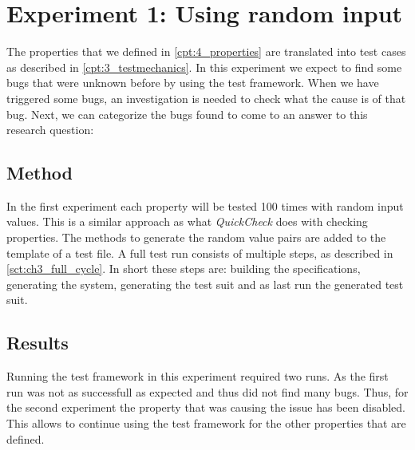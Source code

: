 \chapter{Experiment 1: Using random input}
\label{cpt:experiment1}
The properties that we defined in \autoref{cpt:4_properties} are translated into
test cases as described in \autoref{cpt:3_testmechanics}. In this experiment we
expect to find some bugs that were unknown before by using the test framework.
When we have triggered some bugs, an investigation is needed to check what the
cause is of that bug. Next, we can categorize the bugs found to come to an
answer to this research question: \rqThree{}

\section{Method}
In the first experiment each property will be tested 100 times with random input
values. This is a similar approach as what \textit{QuickCheck} does with
checking properties. The methods to generate the random value pairs are added to
the template of a test file. A full test run consists of multiple steps, as
described in \autoref{sct:ch3_full_cycle}. In short these steps are: building
the specifications, generating the system, generating the test suit and as last
run the generated test suit.

\section{Results}
Running the test framework in this experiment required two runs. As the first
run was not as successfull as expected and thus did not find many bugs. Thus,
for the second experiment the property that was causing the issue has been
disabled. This allows to continue using the test framework for the other
properties that are defined.

